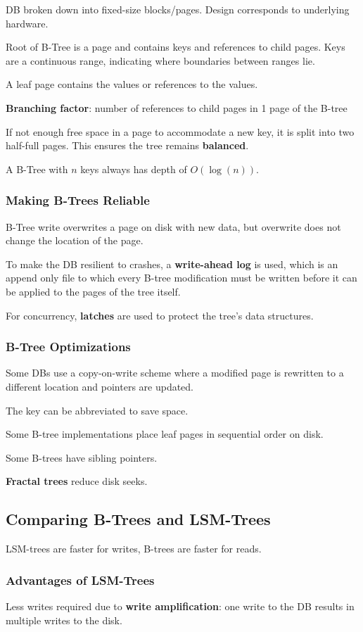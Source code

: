 \documentclass[11pt]{article}
\begin{document}
DB broken down into fixed-size blocks/pages.
Design corresponds to underlying hardware.

Root of B-Tree is a page and contains keys and references to child pages.
Keys are a continuous range, indicating where boundaries between ranges lie.

A leaf page contains the values or references to the values.

\textbf{Branching factor}: number of references to child pages in 1 page of the B-tree

If not enough free space in a page to accommodate a new key, it is split
into two half-full pages.
This ensures the tree remains \textbf{balanced}.

A B-Tree with \(n\) keys always has depth of \(O(\log(n))\).
\subsubsection{Making B-Trees Reliable}
\label{sec:org4e46680}
B-Tree write overwrites a page on disk with new data,
but overwrite does not change the location of the page.

To make the DB resilient to crashes, a \textbf{write-ahead log}
is used, which is an append only file to which
every B-tree modification must be written before it can be
applied to the pages of the tree itself.

For concurrency, \textbf{latches} are used to protect the tree's
data structures.
\subsubsection{B-Tree Optimizations}
\label{sec:orgad39b2f}
Some DBs use a copy-on-write scheme where a modified page is rewritten
to a different location and pointers are updated.

The key can be abbreviated to save space.

Some B-tree implementations place leaf pages in sequential
order on disk.

Some B-trees have sibling pointers.

\textbf{Fractal trees} reduce disk seeks.
\subsection{Comparing B-Trees and LSM-Trees}
\label{sec:org951d922}
LSM-trees are faster for writes, B-trees are faster for reads.
\subsubsection{Advantages of LSM-Trees}
\label{sec:orgd8d7c6d}
Less writes required due to \textbf{write amplification}: one write
to the DB results in multiple writes to the disk.
\end{document}
